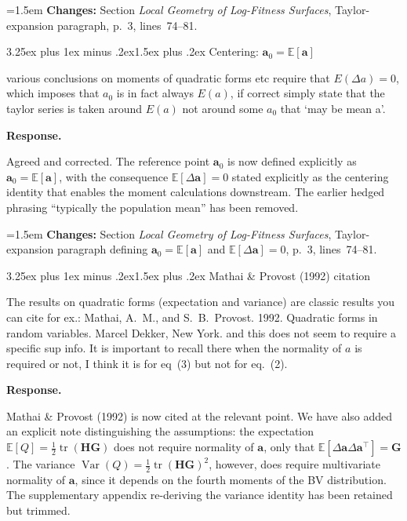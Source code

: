 \documentclass[11pt,a4paper]{article}
\makeatletter
\newcommand{\response}{%
  \par\medskip\noindent\textbf{\color{ResponseColor}Response.}\quad\ignorespaces
}
\newcommand{\changesat}[1]{%
  \par\smallskip\noindent\hangindent=1.5em\hangafter=1
  \textbf{\color{ChangeColor}Changes:} \quad #1\par\medskip
}
\renewcommand{\subsection}{\@startsection{subsection}{2}{0pt}%
  {3.25ex plus 1ex minus .2ex}{1.5ex plus .2ex}%
  {\large\bfseries}}
\newcommand{\mat}[1]{\ensuremath{\mathbf{#1}}}
\newcommand{\vect}[1]{\ensuremath{\bm{#1}}}
\newcommand{\tr}{\ensuremath{\operatorname{tr}}\xspace}
\newcommand{\Var}{\ensuremath{\operatorname{Var}}\xspace}
\makeatother
\begin{document}
\changesat{Section \textit{Local Geometry of Log-Fitness Surfaces}, Taylor-expansion paragraph, p.~3, lines~74--81.}

\subsection{\texorpdfstring{Centering: $\vect{a}_0 = \mathbb{E}[\vect{a}]$}{Centering: a_0 = E[a]}}

\begin{edquote}
various conclusions on moments of quadratic forms etc require that $E(\Delta a)=0$, which imposes that $a_0$ is in fact always $E(a)$, if correct simply state that the taylor series is taken around $E(a)$ not around some $a_0$ that ‘may be mean a’.
\end{edquote}

\response
Agreed and corrected. The reference point $\vect{a}_0$ is now defined explicitly as $\vect{a}_0 = \mathbb{E}[\vect{a}]$, with the consequence $\mathbb{E}[\Delta\vect{a}] = 0$ stated explicitly as the centering identity that enables the moment calculations downstream. The earlier hedged phrasing ``typically the population mean'' has been removed.

\changesat{Section \textit{Local Geometry of Log-Fitness Surfaces}, Taylor-expansion paragraph defining $\vect{a}_0=\mathbb{E}[\vect{a}]$ and $\mathbb{E}[\Delta\vect{a}]=0$, p.~3, lines~74--81.}

\subsection{Mathai \& Provost (1992) citation}

\begin{edquote}
The results on quadratic forms (expectation and variance) are classic results you can cite for ex.: Mathai, A.~M., and S.~B.~Provost. 1992. Quadratic forms in random variables. Marcel Dekker, New York. and this does not seem to require a specific sup info. It is important to recall there when the normality of $a$ is required or not, I think it is for eq~(3) but not for eq.~(2).
\end{edquote}

\response
Mathai \& Provost (1992) is now cited at the relevant point. We have also added an explicit note distinguishing the assumptions: the expectation $\mathbb{E}[Q] = \tfrac{1}{2}\tr(\mat{H}\mat{G})$ does not require normality of $\vect{a}$, only that $\mathbb{E}[\Delta\vect{a}\Delta\vect{a}^{\top}] = \mat{G}$. The variance $\Var(Q) = \tfrac{1}{2}\tr(\mat{H}\mat{G})^2$, however, does require multivariate normality of $\vect{a}$, since it depends on the fourth moments of the BV distribution. The supplementary appendix re-deriving the variance identity has been retained but trimmed.
\end{document}
